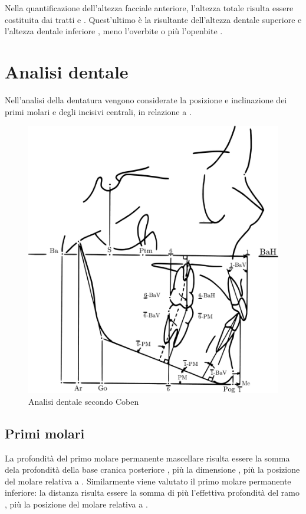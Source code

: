 Nella quantificazione dell'altezza facciale anteriore, l'altezza totale  risulta essere costituita dai tratti  e . Quest'ultimo è la risultante dell'altezza dentale superiore  e l'altezza dentale inferiore , meno l'overbite o più l'openbite .

\section{Analisi dentale}
Nell'analisi della dentatura vengono considerate la posizione e inclinazione dei primi molari e degli incisivi centrali, in relazione a .

\begin{figure}
\centering
\includegraphics[width=.6\columnwidth]{./images/coben_dentale.pdf}
\caption{Analisi dentale secondo Coben}
\label{fig:coben_dentale}
\end{figure}

\subsection*{Primi molari}
La profondità del primo molare permanente mascellare  risulta essere la somma dela profondità della base cranica posteriore , più la dimensione , più la posizione del molare relativa a  . Similarmente viene valutato il primo molare permanente inferiore: la distanza  risulta essere la somma di  più l'effettiva profondità del ramo , più la posizione del molare relativa a  .

